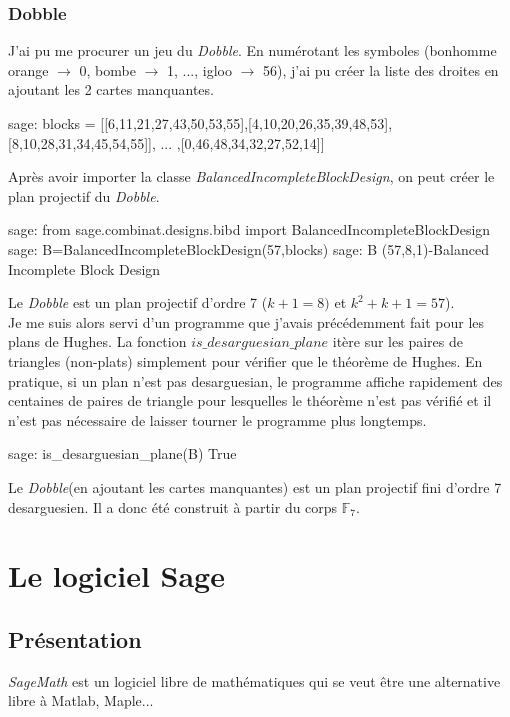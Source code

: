 \documentclass[a4paper]{article}
\begin{document}
\subsubsection{Dobble}
J'ai pu me procurer un jeu du \textit{Dobble}. En numérotant les symboles (bonhomme orange $\rightarrow$ 0, bombe $\rightarrow$ 1, ..., igloo $\rightarrow$ 56), j'ai pu créer la liste des droites en ajoutant les 2 cartes manquantes.
\begin{sageverbatim}
  sage: blocks = [[6,11,21,27,43,50,53,55],[4,10,20,26,35,39,48,53],
        [8,10,28,31,34,45,54,55]], ... ,[0,46,48,34,32,27,52,14]]
\end{sageverbatim}
Après avoir importer la classe \textit{BalancedIncompleteBlockDesign}, on peut créer le plan projectif du \textit{Dobble}.
\begin{sageverbatim}
 sage: from sage.combinat.designs.bibd import BalancedIncompleteBlockDesign
 sage: B=BalancedIncompleteBlockDesign(57,blocks)
 sage: B
 (57,8,1)-Balanced Incomplete Block Design
\end{sageverbatim}
Le \textit{Dobble} est un plan projectif d'ordre 7 ($k+1=8)$ et $k^2+k+1=57$).\\
Je me suis alors servi d'un programme que j'avais précédemment fait pour les plans de Hughes. La fonction $is\_desarguesian\_plane$ itère sur les paires de triangles (non-plats) simplement pour vérifier que le théorème de Hughes. En pratique, si un plan n'est pas desarguesian, le programme affiche rapidement des centaines de paires de triangle pour lesquelles le théorème n'est pas vérifié et il n'est pas nécessaire de laisser tourner le programme plus longtemps.
\begin{sageverbatim}
 sage: is_desarguesian_plane(B)
 True
\end{sageverbatim}
Le \textit{Dobble}(en ajoutant les cartes manquantes) est un plan projectif fini d'ordre 7 desarguesien. Il a donc été construit à partir du corps $\mathbb{F}_7$.
\newpage

\section{Le logiciel Sage}
\subsection{Présentation}
\textit{SageMath} est un logiciel libre de mathématiques qui se veut être une alternative libre à Matlab, Maple...\vspace{1\baselineskip}\\
\end{document}
